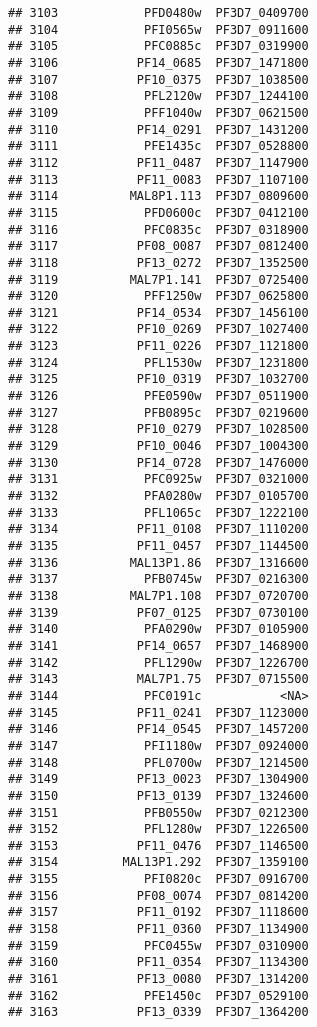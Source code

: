 \documentclass{article}\usepackage[]{graphicx}\usepackage[]{color}
\makeatletter
\newenvironment{kframe}{%
 \def\at@end@of@kframe{}%
 \ifinner\ifhmode%
  \def\at@end@of@kframe{\end{minipage}}%
  \begin{minipage}{\columnwidth}%
 \fi\fi%
 \def\FrameCommand##1{\hskip\@totalleftmargin \hskip-\fboxsep
 \colorbox{shadecolor}{##1}\hskip-\fboxsep
     \hskip-\linewidth \hskip-\@totalleftmargin \hskip\columnwidth}%
 \MakeFramed {\advance\hsize-\width
   \@totalleftmargin\z@ \linewidth\hsize
   \@setminipage}}%
 {\par\unskip\endMakeFramed%
 \at@end@of@kframe}
\newenvironment{knitrout}{}{} %
\makeatother
\begin{document}
\begin{knitrout}
\begin{kframe}
\begin{verbatim}
## 3103            PFD0480w  PF3D7_0409700
## 3104            PFI0565w  PF3D7_0911600
## 3105            PFC0885c  PF3D7_0319900
## 3106           PF14_0685  PF3D7_1471800
## 3107           PF10_0375  PF3D7_1038500
## 3108            PFL2120w  PF3D7_1244100
## 3109            PFF1040w  PF3D7_0621500
## 3110           PF14_0291  PF3D7_1431200
## 3111            PFE1435c  PF3D7_0528800
## 3112           PF11_0487  PF3D7_1147900
## 3113           PF11_0083  PF3D7_1107100
## 3114          MAL8P1.113  PF3D7_0809600
## 3115            PFD0600c  PF3D7_0412100
## 3116            PFC0835c  PF3D7_0318900
## 3117           PF08_0087  PF3D7_0812400
## 3118           PF13_0272  PF3D7_1352500
## 3119          MAL7P1.141  PF3D7_0725400
## 3120            PFF1250w  PF3D7_0625800
## 3121           PF14_0534  PF3D7_1456100
## 3122           PF10_0269  PF3D7_1027400
## 3123           PF11_0226  PF3D7_1121800
## 3124            PFL1530w  PF3D7_1231800
## 3125           PF10_0319  PF3D7_1032700
## 3126            PFE0590w  PF3D7_0511900
## 3127            PFB0895c  PF3D7_0219600
## 3128           PF10_0279  PF3D7_1028500
## 3129           PF10_0046  PF3D7_1004300
## 3130           PF14_0728  PF3D7_1476000
## 3131            PFC0925w  PF3D7_0321000
## 3132            PFA0280w  PF3D7_0105700
## 3133            PFL1065c  PF3D7_1222100
## 3134           PF11_0108  PF3D7_1110200
## 3135           PF11_0457  PF3D7_1144500
## 3136          MAL13P1.86  PF3D7_1316600
## 3137            PFB0745w  PF3D7_0216300
## 3138          MAL7P1.108  PF3D7_0720700
## 3139           PF07_0125  PF3D7_0730100
## 3140            PFA0290w  PF3D7_0105900
## 3141           PF14_0657  PF3D7_1468900
## 3142            PFL1290w  PF3D7_1226700
## 3143           MAL7P1.75  PF3D7_0715500
## 3144            PFC0191c           <NA>
## 3145           PF11_0241  PF3D7_1123000
## 3146           PF14_0545  PF3D7_1457200
## 3147            PFI1180w  PF3D7_0924000
## 3148            PFL0700w  PF3D7_1214500
## 3149           PF13_0023  PF3D7_1304900
## 3150           PF13_0139  PF3D7_1324600
## 3151            PFB0550w  PF3D7_0212300
## 3152            PFL1280w  PF3D7_1226500
## 3153           PF11_0476  PF3D7_1146500
## 3154         MAL13P1.292  PF3D7_1359100
## 3155            PFI0820c  PF3D7_0916700
## 3156           PF08_0074  PF3D7_0814200
## 3157           PF11_0192  PF3D7_1118600
## 3158           PF11_0360  PF3D7_1134900
## 3159            PFC0455w  PF3D7_0310900
## 3160           PF11_0354  PF3D7_1134300
## 3161           PF13_0080  PF3D7_1314200
## 3162            PFE1450c  PF3D7_0529100
## 3163           PF13_0339  PF3D7_1364200

\end{verbatim}
\end{kframe}
\end{knitrout}
\end{document}
